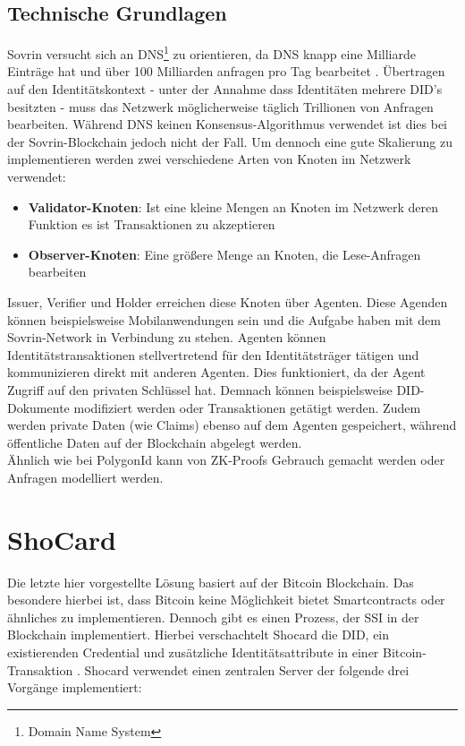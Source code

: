 \subsection{Technische Grundlagen}
Sovrin versucht sich an DNS\footnote{Domain Name System} zu orientieren, da DNS knapp eine Milliarde Einträge hat und über 100 Milliarden anfragen pro Tag bearbeitet \cite{ID42}. Übertragen auf den Identitätskontext - unter der Annahme dass Identitäten mehrere DID's besitzten - muss das Netzwerk möglicherweise täglich Trillionen von Anfragen bearbeiten.
Während DNS keinen Konsensus-Algorithmus verwendet ist dies bei der Sovrin-Blockchain jedoch nicht der Fall. Um dennoch eine gute Skalierung zu implementieren werden zwei verschiedene Arten von Knoten im Netzwerk verwendet:
\begin{itemize}
	\item \textbf{Validator-Knoten}: Ist eine kleine Mengen an Knoten im Netzwerk deren Funktion es ist Transaktionen zu akzeptieren
	\item \textbf{Observer-Knoten}: Eine größere Menge an Knoten, die Lese-Anfragen bearbeiten
\end{itemize}
Issuer, Verifier und Holder erreichen diese Knoten über Agenten. Diese Agenden können beispielsweise Mobilanwendungen sein und die Aufgabe haben mit dem Sovrin-Network in Verbindung zu stehen. Agenten können Identitätstransaktionen stellvertretend für den Identitätsträger tätigen und kommunizieren direkt mit anderen Agenten. Dies funktioniert, da der Agent Zugriff auf den privaten Schlüssel hat. Demnach können beispielsweise DID-Dokumente modifiziert werden oder Transaktionen getätigt werden.
Zudem werden private Daten (wie Claims) ebenso auf dem Agenten gespeichert, während öffentliche Daten auf der Blockchain abgelegt werden. \\
Ähnlich wie bei PolygonId kann von ZK-Proofs Gebrauch gemacht werden oder Anfragen modelliert werden.

\section{ShoCard}
Die letzte hier vorgestellte Lösung basiert auf der Bitcoin Blockchain. Das besondere hierbei ist, dass Bitcoin keine Möglichkeit bietet Smartcontracts oder ähnliches zu implementieren. Dennoch gibt es einen Prozess, der SSI in der Blockchain implementiert. Hierbei verschachtelt Shocard die DID, ein existierenden Credential und zusätzliche Identitätsattribute in einer Bitcoin-Transaktion \cite{ID46}. Shocard verwendet einen zentralen Server der folgende drei Vorgänge implementiert:

